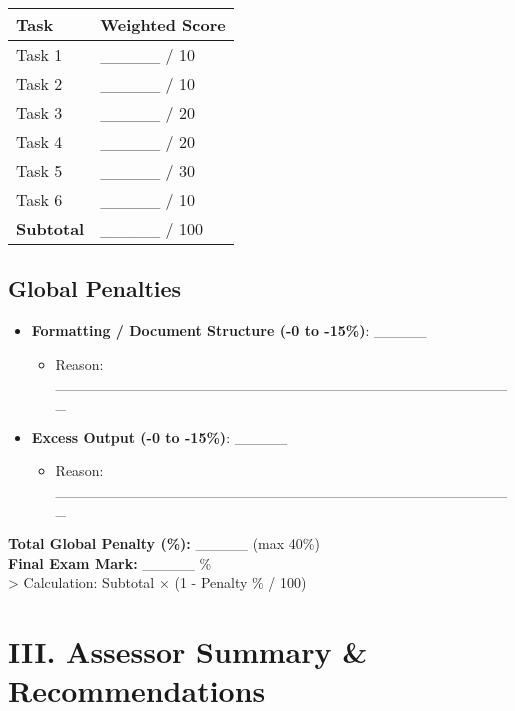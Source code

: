 \documentclass[
  10pt,
]{article}
\providecommand{\tightlist}{%
  \setlength{\itemsep}{0pt}\setlength{\parskip}{0pt}}
\begin{document}
\begin{longtable}[]{@{}ll@{}}
\toprule\noalign{}
Task & Weighted Score \\
\midrule\noalign{}
\endhead
\bottomrule\noalign{}
\endlastfoot
Task 1 & \_\_\_\_\_ / 10 \\
Task 2 & \_\_\_\_\_ / 10 \\
Task 3 & \_\_\_\_\_ / 20 \\
Task 4 & \_\_\_\_\_ / 20 \\
Task 5 & \_\_\_\_\_ / 30 \\
Task 6 & \_\_\_\_\_ / 10 \\
\textbf{Subtotal} & \_\_\_\_\_ / 100 \\
\end{longtable}

\subsection{Global Penalties}\label{global-penalties}

\begin{itemize}
\tightlist
\item
  \textbf{Formatting / Document Structure (-0 to -15\%)}: \_\_\_\_\_

  \begin{itemize}
  \tightlist
  \item
    Reason:
    \_\_\_\_\_\_\_\_\_\_\_\_\_\_\_\_\_\_\_\_\_\_\_\_\_\_\_\_\_\_\_\_\_\_\_\_\_\_\_\_\_\_\_\_\\
  \end{itemize}
\item
  \textbf{Excess Output (-0 to -15\%)}: \_\_\_\_\_

  \begin{itemize}
  \tightlist
  \item
    Reason:
    \_\_\_\_\_\_\_\_\_\_\_\_\_\_\_\_\_\_\_\_\_\_\_\_\_\_\_\_\_\_\_\_\_\_\_\_\_\_\_\_\_\_\_\_
  \end{itemize}
\end{itemize}

\textbf{Total Global Penalty (\%):} \_\_\_\_\_ (max 40\%)\\
\textbf{Final Exam Mark:} \_\_\_\_\_ \%\\
\textgreater{} Calculation: Subtotal × (1 - Penalty \% / 100)

\section{III. Assessor Summary \&
Recommendations}\label{iii.-assessor-summary-recommendations}
\end{document}
